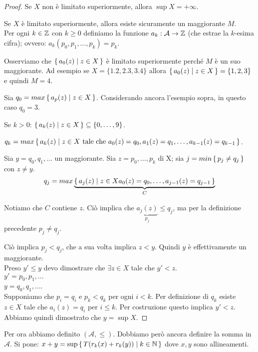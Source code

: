\begin{proof}
Se $X$ non è limitato superiormente, allora $\sup X = +\infty$.

Se $X$ è limitato superiormente, allora esiste sicuramente un maggiorante $M$. \\
Per ogni $k \in \mathbb Z$ con $k \ge 0$ definiamo la funzione $a_k : \mathcal{A} \rightarrow \mathbb Z$ (che estrae la $k$-esima cifra); ovvero: $a_k(p_0, p_1, \dots, p_k) = p_k$.

Osserviamo che $\set{a_0(z) | z \in X}$ è limitato superiormente perché $M$ è un suo maggiorante. Ad esempio se $X = \{1.2, 2.3, 3.4 \}$ allora $\set{a_0(z) | z \in X} = \{1, 2, 3\}$ e quindi $M = 4$.

Sia $q_0 = max \set{a_p(z) | z \in X}$. Considerando ancora l'esempio sopra, in questo caso $q_0 = 3$.

Se $k > 0$: $\set{a_k(z) | z \in X} \subseteq \{0, \dots, 9\}$.

$q_k = max \set{a_k(z) | z \in X \text{ tale che } a_0(z)=q_0, a_1(z)=q_1, \dots, a_{k-1}(z) = q_{k-1}}$.

Sia $y = q_0, q_1, \dots$ un maggiorante.
Sia $z = p_0, \dots, p_k$ di X; sia $j = min \set{p_j \neq q_j}$ con $z \neq y$.
\begin{equation*}
q_j = max \underbrace{\set{a_j(z) | z \in X a_0(z) = q_0, \dots, a_{j-1}(z) = q_{j-1}}}_{C}
\end{equation*}

Notiamo che $C$ contiene $z$. Ciò implica che $\underbrace{a_j(z)}_{p_j} \le q_j$, ma per la definizione precedente $p_j \neq q_j$. 

Ciò implica $p_j < q_j$, che a sua volta implica $z < y$. Quindi $y$ è effettivamente un maggiorante. \\

Preso $y' \le y$ devo dimostrare che $\exists z \in X$ tale che $y' < z$. \\
$y' = p_0, p_1, \dots$ \\
$y = q_0, q_1, \dots$.\\
Supponiamo che $p_i = q_i$ e $p_k < q_k$ per ogni $i < k$. Per definizione di $q_k$ esiste $z \in X$ tale che $a_i(z) = q_i$ per $i \le k$. Per costruzione questo implica $y' < z$. Abbiamo quindi dimostrato che $y = \sup X$.
\end{proof}

Per ora abbiamo definito $(\mathcal{A}, \le)$. Dobbiamo però ancora definire la somma in $\mathcal{A}$. Si pone: $x + y = \sup \set{T(r_k(x)+r_k(y)) | k \in \mathbb N}$ dove $x, y$ sono allineamenti. 

